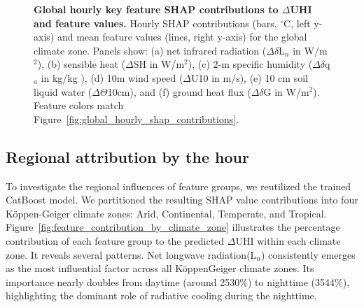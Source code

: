 \bgroup
{}
\begin{figure*}[!htbp]
\centering \makeatletter{}
\makeatother 
\caption{{\textbf{Global hourly key feature SHAP contributions to \ensuremath{\Delta }UHI and feature values. }Hourly SHAP contributions (bars, \ensuremath{^\circ}C, left y-axis) and mean feature values (lines, right y-axis) for the global climate zone. Panels show: (a) net infrared radiation (\ensuremath{\Delta }\ensuremath{\delta }L\ensuremath{_{n}} in W/m\ensuremath{^2}), (b) sensible heat (\ensuremath{\Delta }SH in W/m\ensuremath{^2}), (c) 2-m specific humidity (\ensuremath{\Delta }\ensuremath{\delta }q\ensuremath{_{a}} in kg/kg ), (d) 10m wind speed (\ensuremath{\Delta }U10 in m/s), (e) 10 cm soil liquid water (\ensuremath{\Delta }\ensuremath{\Theta}10cm), and (f) ground heat flux (\ensuremath{\Delta }\ensuremath{\delta }G in W/m\ensuremath{^2}). Feature colors match Figure~\ref{fig:global_hourly_shap_contributions}.}}
\label{fig:global_hourly_key_feature_shap}
\end{figure*}
\egroup




\subsection*{Regional attribution by the hour}To investigate the regional influences of feature groups, we reutilized the trained CatBoost model. We partitioned the resulting SHAP value contributions into four K{\"{o}}ppen-Geiger climate zones: Arid, Continental, Temperate, and Tropical. Figure~\ref{fig:feature_contribution_by_climate_zone}  illustrates the percentage contribution of each feature group to the predicted \ensuremath{\Delta }UHI within each climate zone.  It reveals several patterns. Net longwave radiation(L\ensuremath{_{n}}) consistently emerges as the most influential factor across all K{\"{o}}ppen{\textendash}Geiger climate zones. Its importance nearly doubles from daytime (around 25{\textendash}30\%) to nighttime (35{\textendash}44\%), highlighting the dominant role of radiative cooling during the nighttime.

